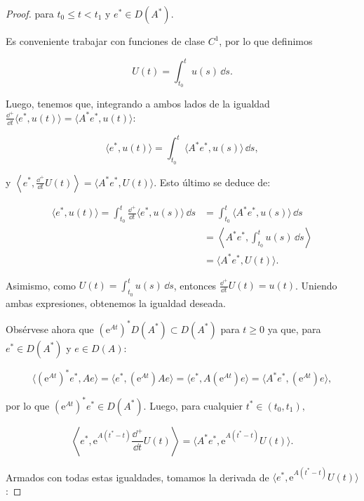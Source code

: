 \begin{proof}
    para $t_0 \leq t < t_1$ y $e^* \in D(A^*)$.

    Es conveniente trabajar con funciones de clase $C^1$, por lo que definimos

    \[U(t) = \int_{t_0}^t u(s) \, \dd s.\]

    Luego, tenemos que, integrando a ambos lados de la igualdad $\displaystyle \frac{\dd^+}{\dd t}\langle e^*, u(t) \rangle = \langle A^* e^*, u(t) \rangle$:

    \[\langle e^*, u(t) \rangle = \int_{t_0}^t \langle A^* e^*, u(s) \rangle \, \dd s,\]

    y $\displaystyle \left \langle e^* , \frac{\dd^+}{\dd t}U(t) \right \rangle = \langle A^* e^*, U(t) \rangle$. Esto último se deduce de:

    \begin{align*}
        \langle e^*, u(t) \rangle = \int_{t_0}^t \frac{\dd^+}{\dd t} \langle e^*, u(s) \rangle \, \dd s &= \int_{t_0}^t \langle A^* e^*, u(s) \rangle \, \dd s\\
        &= \left \langle A^* e^*, \int_{t_0}^t u(s) \, \dd s \right \rangle\\
        &= \langle A^* e^*, U(t) \rangle.
    \end{align*}

    Asimismo, como $U(t) = \int_{t_0}^t u(s) \, \dd s$, entonces $\displaystyle \frac{\dd^+}{\dd t} U(t) = u(t)$. Uniendo ambas expresiones, obtenemos la igualdad deseada.

    Obsérvese ahora que $(\mathrm{e}^{At})^* D(A^*) \subset D(A^*)$ para $t \geq 0$ ya que, para $e^* \in D(A^*)$ y $e \in D(A)$:

    \[ \big \langle (\mathrm{e}^{At})^* e^*, Ae \big \rangle = \big \langle e^*, (\mathrm{e}^{At})Ae \big \rangle = \big \langle e^*, A(\mathrm{e}^{At})e \big \rangle = \big \langle A^*e^*,(\mathrm{e}^{At})e \big \rangle, \]

    por lo que $(\mathrm{e}^{At})^* e^* \in D(A^*).$ Luego, para cualquier $t^* \in (t_0, t_1),$

    \[\left \langle e^*, \mathrm{e}^{A(t^* - t)}\frac{\dd^+}{\dd t}U(t)\right \rangle = \langle A^* e^*, \mathrm{e}^{A(t^* - t)}U(t) \rangle.\]

    Armados con todas estas igualdades, tomamos la derivada de $\langle e^*, \mathrm{e}^{A(t^* - t)}U(t) \rangle$:


\end{proof}

